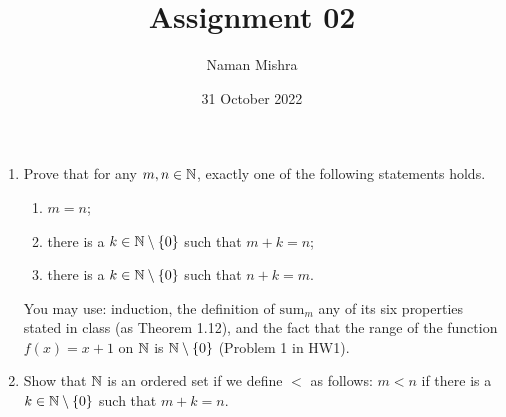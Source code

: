 \documentclass[12pt]{article}
\title{Assignment 02}
\author{Naman Mishra}
\date{31 October 2022}
\begin{document}
\maketitle

\begin{problem} \leavevmode
    \begin{enumerate}[label=(\alph*)]
        \item Prove that for any $m, n \in \mathbb{N}$, exactly one of the following statements holds.
        \begin{enumerate}[label=(\textit{\roman*})]
            \item $m = n$;
            \item there is a $k \in \N \setminus \set{0}$ such that $m + k = n$;
            \item there is a $k \in \N \setminus \set{0}$ such that $n + k = m$.
        \end{enumerate}
        You may use: induction, the definition of $\mathrm{sum}_{m}$ any of its six properties stated in class (as Theorem 1.12), and the fact that the range of the function $f(x) = x + 1$ on $\mathbb{N}$ is $\N \setminus \set{0}$ (Problem 1 in HW1).
        \item Show that $\mathbb{N}$ is an ordered set if we define $<$ as follows: $m < n$ if there is a $k \in \N \setminus \set{0}$ such that $m + k = n$.  
    \end{enumerate}
\end{problem}
\end{document}
